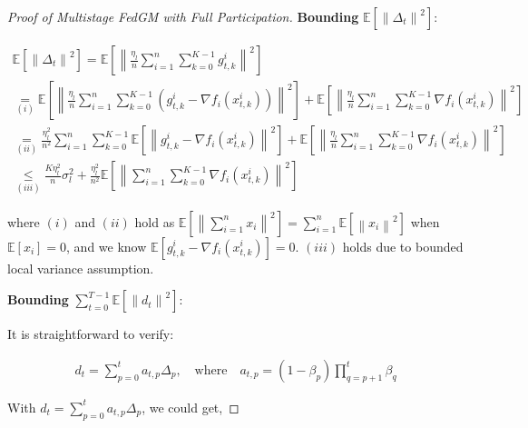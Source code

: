 \begin{proof}[Proof of Multistage FedGM with Full Participation]
\textbf{Bounding} $\mathbb{E}\left[\left\| \Delta_t\right\|^2\right]$:

\begin{equation}
\begin{gathered}
\mathbb{E}\left[\left\| \Delta_t\right\|^2\right] = \mathbb{E}\left[\left\| \frac{\eta_l}{n}\sum_{i=1}^n\sum_{k=0}^{K-1} g_{t,k}^i \right\|^2\right]\\
\underset{(i)}{=} \mathbb{E}\left[\left\| \frac{\eta_l}{n}\sum_{i=1}^n\sum_{k=0}^{K-1} \left(g_{t,k}^i-\nabla f_i(x_{t,k}^i)\right) \right\|^2\right]+\mathbb{E}\left[\left\| \frac{\eta_l}{n}\sum_{i=1}^n\sum_{k=0}^{K-1}  \nabla f_i(x_{t,k}^i)  \right\|^2\right]\\
\underset{(ii)}{=} \frac{\eta_l^2 }{n^2}\sum_{i=1}^n\sum_{k=0}^{K-1} \mathbb{E}\left[\left\|  g_{t,k}^i-\nabla f_i(x_{t,k}^i) \right\|^2\right]+\mathbb{E}\left[\left\| \frac{\eta_l}{n}\sum_{i=1}^n\sum_{k=0}^{K-1}  \nabla f_i(x_{t,k}^i)  \right\|^2\right]\\
\underset{(iii)}{\leq} \frac{K\eta_l^2}{n} \sigma^2_l+\frac{\eta_l^2}{n^2}\mathbb{E}\left[\left\| \sum_{i=1}^n\sum_{k=0}^{K-1}  \nabla f_i(x_{t,k}^i) \right\|^2\right]
\end{gathered}\nonumber
\end{equation}

where $(i)$ and $(ii)$ hold as $\mathbb{E}\left[\left\|\sum_{i=1}^n x_i\right\|^2\right] = \sum_{i=1}^n \mathbb{E}\left[\left\| x_i \right\|^2\right]$ when $\mathbb{E}\left[ x_i \right]=0$, and we know $\mathbb{E}\left[g_{t,k}^i-\nabla f_i(x_{t,k}^i)\right]=0$. $(iii)$ holds due to bounded local variance assumption.


\textbf{Bounding} $\sum_{t=0}^{T-1}\mathbb{E}\left[\left\| d_t\right\|^2\right]$:

It is straightforward to verify:

\begin{equation}
\begin{gathered}
 d_t = \sum_{p=0}^t a_{t,p}\Delta_p,         \quad  \text{where} \quad  a_{t,p}=\left(1-\beta_p\right)\prod_{q=p+1}^t\beta_q
\end{gathered}\nonumber
\end{equation}

With $d_t = \sum_{p=0}^t a_{t,p}\Delta_p$, we could get,


\end{proof}
